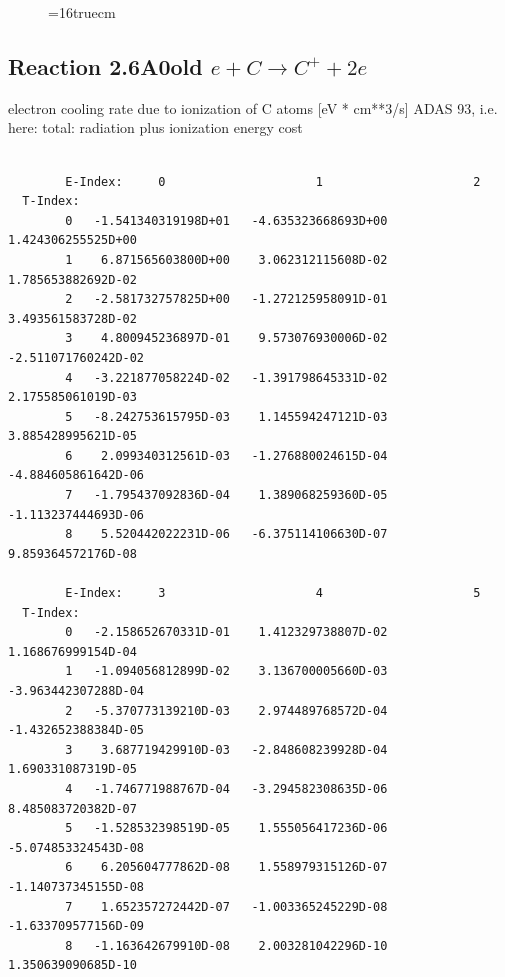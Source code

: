 \documentclass[12pt,dvipdfmx]{article}
\begin{document}
\begin{small}
\begin{verbatim}
\end{verbatim}\end{small}


\begin{figure} \label{2.6il}
\epsfxsize=16truecm
\end{figure}
\newpage

\subsection{
  Reaction 2.6A0old  $e + C  \rightarrow C^+   + 2e $
}
electron cooling rate due to ionization of C atoms [eV * cm**3/s]
ADAS 93, i.e. here: total: radiation plus ionization energy cost

\begin{small}\begin{verbatim}

        E-Index:     0                     1                     2
  T-Index:
        0   -1.541340319198D+01   -4.635323668693D+00    1.424306255525D+00
        1    6.871565603800D+00    3.062312115608D-02    1.785653882692D-02
        2   -2.581732757825D+00   -1.272125958091D-01    3.493561583728D-02
        3    4.800945236897D-01    9.573076930006D-02   -2.511071760242D-02
        4   -3.221877058224D-02   -1.391798645331D-02    2.175585061019D-03
        5   -8.242753615795D-03    1.145594247121D-03    3.885428995621D-05
        6    2.099340312561D-03   -1.276880024615D-04   -4.884605861642D-06
        7   -1.795437092836D-04    1.389068259360D-05   -1.113237444693D-06
        8    5.520442022231D-06   -6.375114106630D-07    9.859364572176D-08

        E-Index:     3                     4                     5
  T-Index:
        0   -2.158652670331D-01    1.412329738807D-02    1.168676999154D-04
        1   -1.094056812899D-02    3.136700005660D-03   -3.963442307288D-04
        2   -5.370773139210D-03    2.974489768572D-04   -1.432652388384D-05
        3    3.687719429910D-03   -2.848608239928D-04    1.690331087319D-05
        4   -1.746771988767D-04   -3.294582308635D-06    8.485083720382D-07
        5   -1.528532398519D-05    1.555056417236D-06   -5.074853324543D-08
        6    6.205604777862D-08    1.558979315126D-07   -1.140737345155D-08
        7    1.652357272442D-07   -1.003365245229D-08   -1.633709577156D-09
        8   -1.163642679910D-08    2.003281042296D-10    1.350639090685D-10


\end{verbatim}
\end{small}
\end{document}
